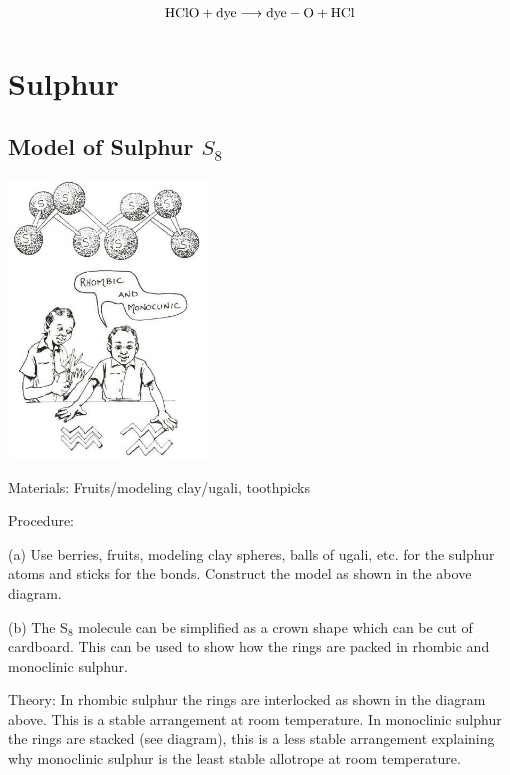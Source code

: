 \begin{multicols}{2}
\begin{description*}
{$$\ce{HClO} + \mathrm{dye} \longrightarrow \mathrm{dye-O} + \ce{HCl}$$}
\end{description*}


\section*{Sulphur}


\subsection{Model of Sulphur $S_8$}

\begin{center}
\includegraphics[width=0.4\textwidth]{./img/source/sulphur-model.jpg}
\end{center}

\begin{description*}
\item[Materials:]{Fruits/modeling clay/ugali, toothpicks}
\item[Procedure:]{(a) Use berries, fruits, modeling
clay spheres, balls of ugali, etc. for the sulphur atoms and
sticks for the bonds. Construct the model as
shown in the above diagram.

(b) The S$_8$ molecule can be simplified as a
crown shape which can be cut of cardboard.
This can be used to show how the rings are
packed in rhombic and monoclinic sulphur.}
\item[Theory:]{In rhombic sulphur the rings are interlocked
as shown in the diagram above. This is a stable
arrangement at room temperature. In
monoclinic sulphur the rings are stacked (see
diagram), this is a less stable arrangement
explaining why monoclinic sulphur is the least
stable allotrope at room temperature.}
\end{description*}


\end{multicols}
